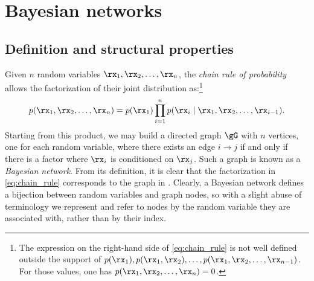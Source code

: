\section{Bayesian networks}
\label{sec:bayesian_networks}

\subsection{Definition and structural properties}
\label{sec:bayesian_net_definition}

Given $n$ random variables $\rx_1, \rx_2, \dots, \rx_n$, the \emph{chain rule of probability} allows the factorization of their joint distribution as:\footnote{The expression on the right-hand side of \eqref{eq:chain_rule} is not well defined outside the support of $p(\rx_1), p(\rx_1, \rx_2), \dots, p(\rx_1, \rx_2, \dots, \rx_{n-1})$. For those values, one has $p(\rx_1, \rx_2, \dots, \rx_n)=0$.}
\begin{equation}
    \label{eq:chain_rule}
    p(\rx_1,\rx_2,\dots,\rx_n) = p(\rx_1) \prod_{i=1}^n p(\rx_i \mid \rx_{1}, \rx_{2}, \dots, \rx_{i-1}).
\end{equation}
Starting from this product, we may build a directed graph $\gG$ with $n$ vertices, one for each random variable, where there exists an edge $i \rightarrow j$ if and only if there is a factor where $\rx_i$ is conditioned on $\rx_j$. Such a graph is known as a \emph{Bayesian network}. From its definition, it is clear that the factorization in \eqref{eq:chain_rule} corresponds to the graph in . Clearly, a Bayesian network defines a bijection between random variables and graph nodes, so with a slight abuse of terminology we represent and refer to nodes by the random variable they are associated with, rather than by their index.

